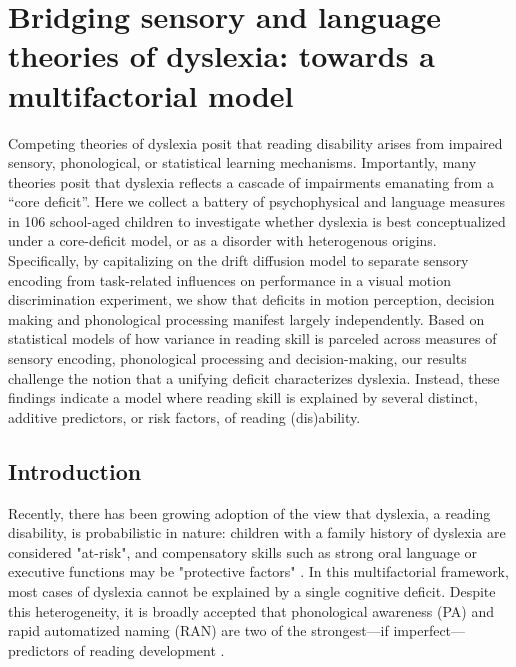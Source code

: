 \documentclass[../uwthesis.tex]{subfiles}
\begin{document}
\chapter{Bridging sensory and language theories of dyslexia: towards a multifactorial model}

Competing theories of dyslexia posit that reading disability arises from impaired sensory, phonological, or statistical learning mechanisms. Importantly, many theories posit that dyslexia reflects a cascade of impairments emanating from a “core deficit”. Here we collect a battery of psychophysical and language measures in 106 school-aged children to investigate whether dyslexia is best conceptualized under a core-deficit model, or as a disorder with heterogenous origins. Specifically, by capitalizing on the drift diffusion model to separate sensory encoding from task-related influences on performance in a visual motion discrimination experiment, we show that deficits in motion perception, decision making and phonological processing manifest largely independently. Based on statistical models of how variance in reading skill is parceled across measures of sensory encoding, phonological processing and decision-making, our results challenge the notion that a unifying deficit characterizes dyslexia. Instead, these findings indicate a model where reading skill is explained by several distinct, additive predictors, or risk factors, of reading (dis)ability. 

\section{Introduction}
Recently, there has been growing adoption of the view that dyslexia, a reading disability, is probabilistic in nature: children with a family history of dyslexia are considered "at-risk", and compensatory skills such as strong oral language or executive functions may be "protective factors" \cite{Haft2016Socio-emotionalDisabilities,Hulme2015TheDyslexia,Muter2009ChildrenStudy,Pennington2006}. In this multifactorial framework, most cases of dyslexia cannot be explained by a single cognitive deficit. Despite this heterogeneity, it is broadly accepted that phonological awareness (PA) and rapid automatized naming (RAN) are two of the strongest---if imperfect---predictors of reading development \cite{Pennington2012IndividualModels.,Wolf2000Naming-speedHypothesis}.
\end{document}
